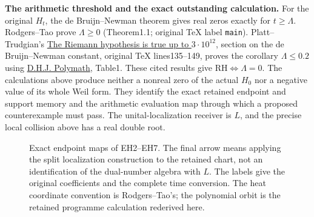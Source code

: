 \documentclass[11pt,a4paper]{article}
\theoremstyle{definition}\newtheorem{definition}[theorem]{Definition}
\begin{document}
\EH\textbf{The arithmetic threshold and the exact outstanding calculation.}
For the original $H_t$, the de Bruijn--Newman theorem gives real zeros
exactly for $t\ge\Lambda$. Rodgers--Tao prove $\Lambda\ge0$
(Theorem1.1; original TeX label \texttt{main}). Platt--Trudgian's
\href{https://arxiv.org/abs/2004.09765}{The Riemann hypothesis is true up
to $3\cdot10^{12}$}, section on the de Bruijn--Newman constant, original
TeX lines135--149, proves the corollary $\Lambda\le0.2$ using
\href{https://arxiv.org/abs/1904.12438}{D.H.J. Polymath}, Table1.
These cited results give $\mathrm{RH}\iff\Lambda=0$.
The calculations above produce neither a nonreal zero of the actual
$H_0$ nor a negative value of its whole Weil form. They identify the
exact retained endpoint and support memory and the arithmetic
evaluation map through which a proposed counterexample must pass.
The unital-localization receiver is $L$, and the precise local collision
above has a real double root.

\begin{figure}[p]
\centering
{}
\caption{Exact endpoint maps of EH2--EH7. The final arrow means applying
the split localization construction to the retained chart, not an
identification of the dual-number algebra with $L$. The labels give the
original coefficients and the complete time conversion. The heat
coordinate convention is Rodgers--Tao's; the polynomial orbit is the
retained programme calculation rederived here.}
\end{figure}
\end{document}
